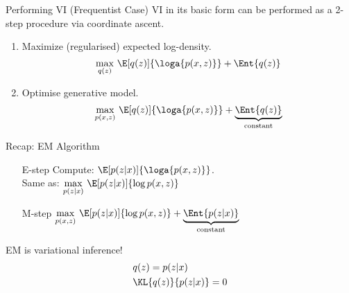 \documentclass[14pt, aspectratio=169]{beamer}
\begin{document}
\begin{frame}{Performing VI (Frequentist Case)}
VI in its basic form can be performed as a 2-step procedure via coordinate ascent.
\begin{enumerate}
\pause
\item Maximize (regularised) expected log-density.
\begin{equation*}
\underset{q(z)}{\max}~\E[q(z)]{\loga{p(x,z)}} + \Ent{q(z)}
\end{equation*}
\pause
\item Optimise generative model.
\begin{equation*}
\underset{p(x,z)}{\max}~ \E[q(z)]{\loga{p(x,z)}} + \underbrace{\Ent{q(z)}}_{\text{constant}}
\end{equation*}
\end{enumerate}
\end{frame}

\begin{frame}{Recap: EM Algorithm}
\begin{itemize}
\item[\alert{E-step}] Compute: $ \E[p(z|x)]{\loga{p(x,z)}} $. \\ Same as: $ \underset{p(z|x)}{\max}~ \E[p(z|x)]{\log p(x,z)} $ \pause
\item[\alert{M-step}] $ \underset{p(x,z)}{\max}~\E[p(z|x)]{\log p(x,z)} + \underbrace{\Ent{p(z|x)}}_{\text{constant}} $
\end{itemize}
\pause 
\begin{block}{EM is variational inference!}
\begin{align*}
&q(z) = p(z|x) \\
&\KL{q(z)}{p(z|x)} = 0
\end{align*}
\end{block}
\end{frame}
\end{document}
